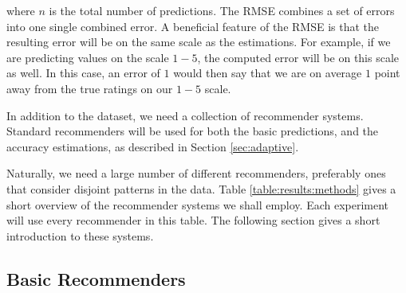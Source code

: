 where $n$ is the total number of predictions.
The RMSE combines a set of errors into one single combined error.
A beneficial feature of the RMSE is that the resulting error 
will be on the same scale as the estimations. For example,
if we are predicting values on the scale $1-5$, the computed error
will be on this scale as well. In this case, an error of $1$
would then say that we are on average $1$ point away from the true 
ratings on our $1-5$ scale.

In addition to the dataset, we need a collection of recommender systems.
Standard recommenders will be used for both the basic predictions,
and the accuracy estimations,
as described in Section \ref{sec:adaptive}.

Naturally, we need a large number of different recommenders, preferably ones that consider
disjoint patterns in the data. Table \ref{table:results:methods}
gives a short overview of the recommender systems we shall employ.
Each experiment will use every recommender in this table.
The following section gives a short introduction to these systems.

\subsection{Basic Recommenders}

